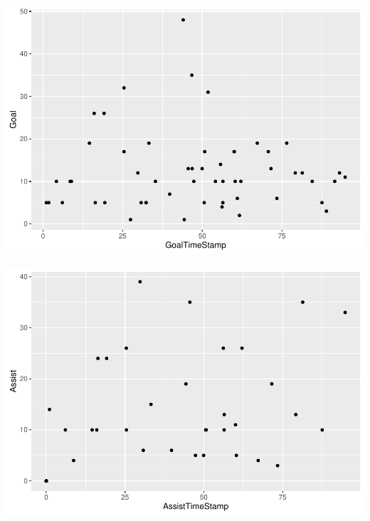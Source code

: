 \documentclass[]{article}
\newenvironment{Shaded}{\begin{snugshade}}{\end{snugshade}}
\newcommand{\DecValTok}[1]{\textcolor[rgb]{0.00,0.00,0.81}{#1}}
\newcommand{\KeywordTok}[1]{\textcolor[rgb]{0.13,0.29,0.53}{\textbf{#1}}}
\newcommand{\NormalTok}[1]{#1}
\newcommand{\OperatorTok}[1]{\textcolor[rgb]{0.81,0.36,0.00}{\textbf{#1}}}
\newcommand{\StringTok}[1]{\textcolor[rgb]{0.31,0.60,0.02}{#1}}
\begin{document}
\includegraphics{GraphAnalysis_files/figure-latex/Goal Game Duration-1.pdf}

\begin{Shaded}
\end{Shaded}

\includegraphics{GraphAnalysis_files/figure-latex/Assist Game Duration-1.pdf}

\begin{Shaded}
\end{Shaded}
\end{document}
